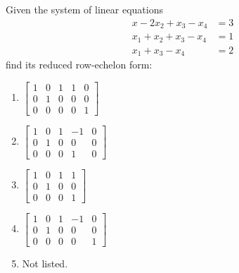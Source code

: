\begin{problem}
  Given the system of linear equations
  \begin{equation}
    \label{eq:2:1}
    \begin{aligned}
      x-2x_2+x_3-x_4&=3\\
      x_1+x_2+x_3-x_4&=1\\
      x_1+x_3-x_4&=2
    \end{aligned}
  \end{equation}
  find its reduced row-echelon form:
  \begin{enumerate}[label=\MakeUppercase{\alph*})]
  \item $\left[
    \begin{smallmatrix}
      1&0&1&1&0\\0&1&0&0&0\\0&0&0&0&1
    \end{smallmatrix}
    \right]$
  \item $\left[
    \begin{smallmatrix}
      1&0&1&-1&0\\0&1&0&0&0\\0&0&0&1&0
    \end{smallmatrix}
    \right]$
  \item $\left[
    \begin{smallmatrix}
      1&0&1&1\\0&1&0&0\\0&0&0&1
    \end{smallmatrix}
    \right]$
    \item $\left[
    \begin{smallmatrix}
      1&0&1&-1&0\\0&1&0&0&0\\0&0&0&0&1
    \end{smallmatrix}
    \right]$
  \item Not listed.
  \end{enumerate}
\end{problem}
\bigskip

